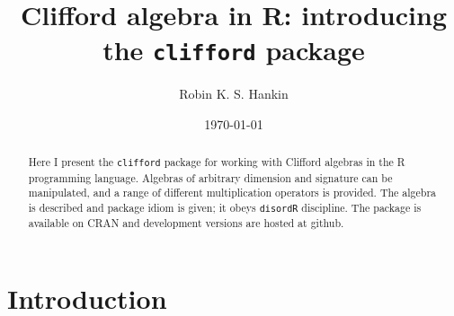 \documentclass{birkjour}
\theoremstyle{definition}
\theoremstyle{remark}
\numberwithin{equation}{section}
\begin{document}
%
%
%
%
%
%
%
%
%

\title[Clifford algebra in R]{
 Clifford algebra in R: introducing the {\tt clifford} package}
\author[Hankin]{Robin K. S. Hankin}
\address{%
  University of Stirling\\
  Stirling FK9 4LH\\
  United Kingdom
}
%
%
%
%
\date{\today}
\begin{abstract}

Here I present the {\tt clifford} package for working with Clifford
algebras in the R programming language.  Algebras of arbitrary
dimension and signature can be manipulated, and a range of different
multiplication operators is provided.  The algebra is described and
package idiom is given; it obeys {\tt disordR} discipline.  The
package is available on CRAN and development versions are hosted at
github.


\end{abstract}
\label{page:firstblob}
\maketitle
\tableofcontents



\section{Introduction}
\end{document}

